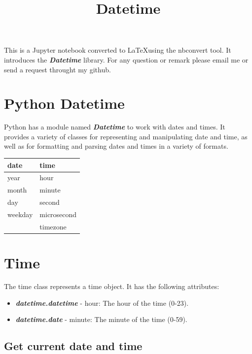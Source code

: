 \documentclass[11pt]{article}
\title{Datetime}
\author{}
\newcounter{none}
\begin{document}
    
    \maketitle

    
This is a Jupyter notebook converted to \LaTeX using the nbconvert tool. It introduces the \textbf{\emph{Datetime}} library. For any question or remark please email me or send a request throught my github.
    
    \section{Python Datetime}

Python has a module named \textbf{\emph{Datetime}} to work with dates and times. It
provides a variety of classes for representing and manipulating date and
time, as well as for formatting and parsing dates and times in a variety
of formats.

{\def\LTcaptype{none} %
\begin{longtable}[]{@{}ll@{}}
\toprule\noalign{}
date & time \\
\midrule\noalign{}
\endhead
\bottomrule\noalign{}
\endlastfoot
year & hour \\
month & minute \\
day & second \\
weekday & microsecond \\
& timezone \\
\end{longtable}
}

\section{Time}

The time class represents a time object. It has the following attributes: 

\begin{itemize}
\item \textbf{\emph{datetime.datetime}} - hour: The hour of the time (0-23). 
\item \textbf{\emph{datetime.date}} - minute: The minute of the time (0-59).
\end{itemize}

\subsection{Get current date and
time}\label{get-current-date-and-time}
\end{document}
